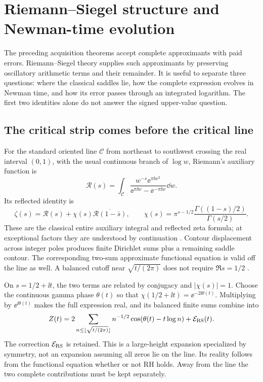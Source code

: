 \section{Riemann--Siegel structure and Newman-time evolution}
\label{sec:RS}

The preceding acquisition theorems accept complete approximants with
paid errors. Riemann--Siegel theory supplies such approximants by
preserving oscillatory arithmetic terms and their remainder. It is
useful to separate three questions: where the classical saddles lie,
how the complete expression evolves in Newman time, and how its error
passes through an integrated logarithm. The first two identities alone
do not answer the signed upper-value question.

\subsection{The critical strip comes before the critical line}
For the standard oriented line \(\mathcal C\) from northeast to
southwest crossing the real interval \((0,1)\), with the usual
continuous branch of \(\log w\), Riemann's auxiliary function is
\begin{equation}\label{eq:RS-auxiliary}
 \mathscr R(s)=\int_{\mathcal C}
 \frac{w^{-s}\ee^{\pi\ii w^2}}{\ee^{\pi\ii w}-\ee^{-\pi\ii w}}\dd w.
\end{equation}
Its reflected identity is
\begin{equation}\label{eq:RS-reflection}
 \zeta(s)=\mathscr R(s)+\chi(s)\overline{\mathscr R(1-\bar s)},
 \qquad
 \chi(s)=\pi^{s-1/2}\frac{\Gamma((1-s)/2)}{\Gamma(s/2)}.
\end{equation}
These are the classical entire auxiliary integral and reflected zeta
formula; at exceptional factors they are understood by continuation
\cite[Section 3, Definition 4 and Theorem 5]{Arias2024AuxiliaryBasic}.
Contour displacement across integer poles produces finite Dirichlet
sums plus a remaining saddle contour. The corresponding two-sum
approximate functional equation is valid off the line as well. A
balanced cutoff near \(\sqrt{t/(2\pi)}\) does not require
\(\Re s=1/2\) \cite[Sections 2 and 8]{Arias2024AuxiliaryExpansions}.

On \(s=1/2+\ii t\), the two terms are related by conjugacy and
\(|\chi(s)|=1\). Choose the continuous gamma phase \(\theta(t)\) so
that \(\chi(1/2+\ii t)=\ee^{-2\ii\theta(t)}\). Multiplying by
\(\ee^{\ii\theta(t)}\) makes the full expression real, and its balanced
finite sums combine into
\begin{equation}\label{eq:RS-cosine}
 Z(t)=2\sum_{n\le\lfloor\sqrt{t/(2\pi)}\rfloor}
 n^{-1/2}\cos(\theta(t)-t\log n)+\mathcal E_{\rm RS}(t).
\end{equation}
The correction \(\mathcal E_{\rm RS}\) is retained. This is a
large-height expansion specialized by symmetry, not an expansion
assuming all zeros lie on the line. Its reality follows from the
functional equation whether or not RH holds. Away from the line the
two complete contributions must be kept separately.

